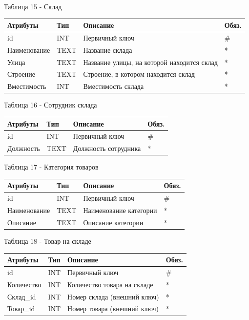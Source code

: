 \documentclass[14pt]{extreport}
\begin{document}
\newpage
\noindent
Таблица 15 - Склад
\begin{center}
\begin{longtable}{ |m{3.3cm}|m{3cm}|m{6cm}|m{1.8cm}| } 
 \hline
 Атрибуты & Тип & Описание & Обяз. \\ [0.5ex] 
 \hline\hline
 id & INT & Первичный ключ & \# \\
 \hline
 Наименование & TEXT & Название склада & * \\
 \hline
 Улица & TEXT & Название улицы, на которой находится склад & * \\
 \hline
 Строение & TEXT & Строение, в котором находится склад & * \\
 \hline
 Вместимость & INT & Вместимость склада & * \\
 \hline
\end{longtable}
\end{center}



\noindent
Таблица 16 - Сотрудник склада
\begin{center}
\begin{longtable}{ |m{3.3cm}|m{3cm}|m{6cm}|m{1.8cm}| } 
 \hline
 Атрибуты & Тип & Описание & Обяз. \\ [0.5ex] 
 \hline\hline
 id & INT & Первичный ключ & \# \\
 \hline
 Должность & TEXT & Должность сотрудника & * \\
 \hline
\end{longtable}
\end{center}



\noindent
Таблица 17 - Категория товаров
\begin{center}
\begin{longtable}{ |m{3.3cm}|m{3cm}|m{6cm}|m{1.8cm}| } 
 \hline
 Атрибуты & Тип & Описание & Обяз. \\ [0.5ex] 
 \hline\hline
 id & INT & Первичный ключ & \# \\
 \hline
 Наименование & TEXT & Наименование категории & * \\
 \hline
 Описание & TEXT & Описание категории & * \\
 \hline
\end{longtable}
\end{center}


\newpage

\noindent
Таблица 18 - Товар на складе
\begin{center}
\begin{longtable}{ |m{3.3cm}|m{3cm}|m{6cm}|m{1.8cm}| } 
 \hline
 Атрибуты & Тип & Описание & Обяз. \\ [0.5ex] 
 \hline\hline
 id & INT & Первичный ключ & \# \\
 \hline
 Количество & INT & Количество товара на складе & * \\
 \hline
 Склад\_id & INT & Номер склада (внешний ключ) & * \\
 \hline
 Товар\_id & INT & Номер товара (внешний ключ) & * \\
 \hline
\end{longtable}
\end{center}
\end{document}
